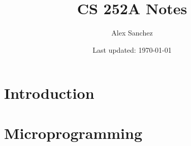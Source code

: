 \documentclass{book}
\title{CS 252A Notes}
\author{Alex Sanchez}
\date{Last updated: \today}
\begin{document}
\maketitle

\chapter{Introduction}


\chapter{Microprogramming}

\end{document}
